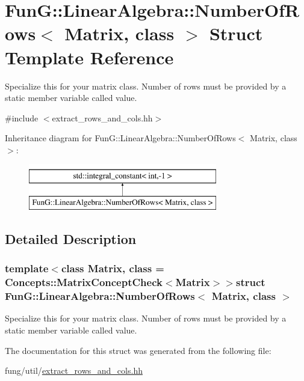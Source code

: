 \hypertarget{structFunG_1_1LinearAlgebra_1_1NumberOfRows}{\section{\-Fun\-G\-:\-:\-Linear\-Algebra\-:\-:\-Number\-Of\-Rows$<$ \-Matrix, class $>$ \-Struct \-Template \-Reference}
\label{structFunG_1_1LinearAlgebra_1_1NumberOfRows}
}


\-Specialize this for your matrix class. \-Number of rows must be provided by a static member variable called value.  




{\ttfamily \#include $<$extract\-\_\-rows\-\_\-and\-\_\-cols.\-hh$>$}

\-Inheritance diagram for \-Fun\-G\-:\-:\-Linear\-Algebra\-:\-:\-Number\-Of\-Rows$<$ \-Matrix, class $>$\-:\begin{figure}[H]
\begin{center}
\leavevmode
\includegraphics[height=2.000000cm]{structFunG_1_1LinearAlgebra_1_1NumberOfRows}
\end{center}
\end{figure}


\subsection{\-Detailed \-Description}
\subsubsection*{template$<$class \-Matrix, class = \-Concepts\-::\-Matrix\-Concept\-Check$<$\-Matrix$>$$>$struct Fun\-G\-::\-Linear\-Algebra\-::\-Number\-Of\-Rows$<$ Matrix, class $>$}

\-Specialize this for your matrix class. \-Number of rows must be provided by a static member variable called value. 

\-The documentation for this struct was generated from the following file\-:\begin{DoxyCompactItemize}
\item 
fung/util/\hyperlink{extract__rows__and__cols_8hh}{extract\-\_\-rows\-\_\-and\-\_\-cols.\-hh}\end{DoxyCompactItemize}
